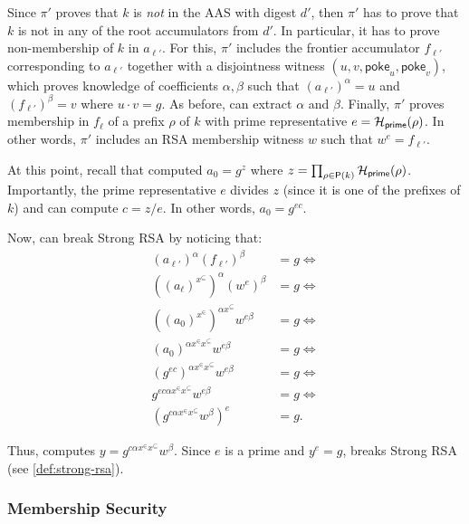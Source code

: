Since $\pi'$ proves that $k$ is \textit{not} in the AAS with digest $d'$, then $\pi'$ has to prove that $k$ is not in any of the root accumulators from $d'$.
In particular, it has to prove non-membership of $k$ in $a_{\ell'}$.
For this, $\pi'$ includes the frontier accumulator $f_{\ell'}$ corresponding to $a_{\ell'}$ together with a disjointness witness $(u,v,\mathsf{poke}_u,\mathsf{poke}_v)$, which proves knowledge of \bezout coefficients $\alpha,\beta$ such that $(a_{\ell'})^\alpha = u$ and $(f_{\ell'})^\beta = v$ where $u\cdot v = g$.
As before, \AdvB can extract $\alpha$ and $\beta$.
Finally, $\pi'$ proves membership in $f_{\ell}$ of a prefix $\rho$ of $k$ with prime representative $e=\mathcal{H}_{\mathsf{prime}}(\rho)$.
In other words, $\pi'$ includes an RSA membership witness $w$ such that $w^e = f_{\ell'}$.

At this point, recall that \AdvB computed $a_0=g^{z}$ where $z=\prod_{\rho\in\mathsf{P}(k)} \mathcal{H}_{\mathsf{prime}}(\rho)$.
Importantly, the prime representative $e$ divides $z$ (since it is one of the prefixes of $k$) and \AdvB can compute $c=z/e$.
In other words, $a_0 = g^{e c}$.

Now, \AdvB can break Strong RSA by noticing that:
\begin{align*}
    \left(a_{\ell'}\right)^\alpha \left(f_{\ell'}\right)^\beta &= g\Leftrightarrow\\
    \left(\left(a_{\ell}\right)^{x^\subseteq}\right)^\alpha \left(w^e\right)^\beta &= g\Leftrightarrow\\
    \left(\left(a_0\right)^{x^\in}\right)^{\alpha x^\subseteq} w^{e\beta} &= g\Leftrightarrow\\
    \left(a_0\right)^{\alpha x^\in x^\subseteq} w^{e\beta} &= g\Leftrightarrow\\
    \left(g^{e c}\right)^{\alpha x^\in x^\subseteq} w^{e\beta} &= g\Leftrightarrow\\
    g^{e c \alpha x^\in x^\subseteq} w^{e\beta} &= g\Leftrightarrow\\
    \left(g^{c \alpha x^\in x^\subseteq} w^{\beta}\right)^e &= g.
\end{align*}

Thus, \AdvB computes $y = g^{c \alpha x^\in x^\subseteq} w^{\beta}$.
Since $e$ is a prime and $y^e = g$, \AdvB breaks Strong RSA (see \cref{def:strong-rsa}).

\subsubsection{Membership Security}
\label{s:aas:from-rsa-acc:proofs:membership-security}

